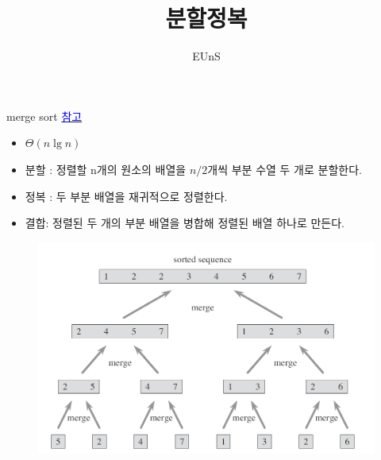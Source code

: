 \documentclass[10pt]{beamer}
\title{분할정복}
\author{EUnS}
\begin{document}
\begin{frame}{}
    \maketitle
\end{frame}    





\begin{frame}{merge sort}
    \href{https://www.youtube.com/watch?v=2YvFRAC8UTM&list=PL52K_8WQO5oUuH06MLOrah4h05TZ4n38l&index=11&t=0s}{\textcolor{blue}{참고}}
    \begin{itemize}
        \item $\Theta(n\lg n)$
        \item 분할 : 정렬할 n개의 원소의 배열을 $n/2$개씩 부분 수열 두 개로 분할한다.
        \item 정복 : 두 부분 배열을 재귀적으로 정렬한다.
        \item 결합: 정렬된 두 개의 부분 배열을 병합해 정렬된 배열 하나로 만든다.
    \end{itemize}
\end{frame}



\begin{frame}{}
    \begin{figure}[h!]
        \includegraphics[scale=0.4]{merge.png}
    \end{figure}
\end{frame}    
\end{document}
